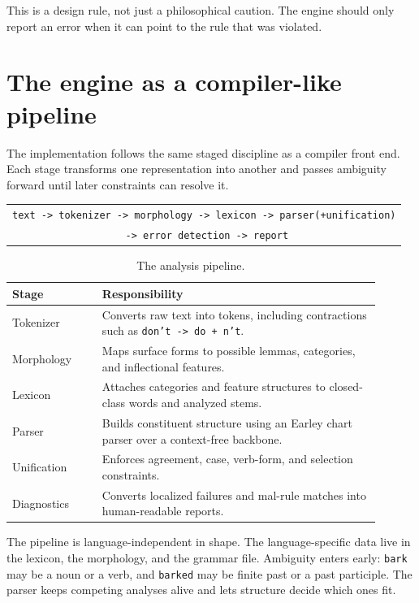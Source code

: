 \documentclass[11pt]{article}
\theoremstyle{definition}
\theoremstyle{plain}
\theoremstyle{remark}
\begin{document}
This is a design rule, not just a philosophical caution. The engine should only report an error
when it can point to the rule that was violated.

\section{The engine as a compiler-like pipeline}

The implementation follows the same staged discipline as a compiler front end. Each stage
transforms one representation into another and passes ambiguity forward until later constraints
can resolve it.

\begin{center}
\begin{tabular}{c}
\texttt{text -> tokenizer -> morphology -> lexicon -> parser(+unification)} \\
\texttt{     -> error detection -> report}
\end{tabular}
\end{center}

\begin{table}[h]
\centering
\begin{tabular}{@{}p{0.22\linewidth}p{0.68\linewidth}@{}}
\toprule
Stage & Responsibility \\
\midrule
Tokenizer & Converts raw text into tokens, including contractions such as
\texttt{don't -> do + n't}. \\
Morphology & Maps surface forms to possible lemmas, categories, and inflectional features. \\
Lexicon & Attaches categories and feature structures to closed-class words and analyzed stems. \\
Parser & Builds constituent structure using an Earley chart parser over a context-free backbone. \\
Unification & Enforces agreement, case, verb-form, and selection constraints. \\
Diagnostics & Converts localized failures and mal-rule matches into human-readable reports. \\
\bottomrule
\end{tabular}
\caption{The analysis pipeline.}
\end{table}

The pipeline is language-independent in shape. The language-specific data live in the lexicon,
the morphology, and the grammar file. Ambiguity enters early: \texttt{bark} may be a noun or a
verb, and \texttt{barked} may be finite past or a past participle. The parser keeps competing
analyses alive and lets structure decide which ones fit.
\end{document}
